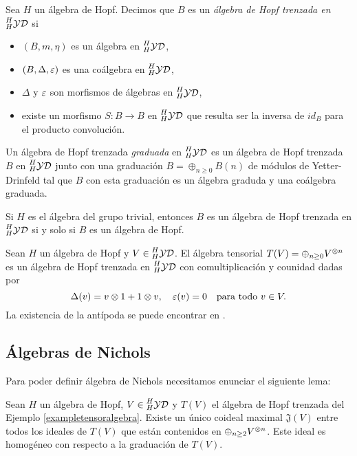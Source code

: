 \documentclass[a4paper,oneside,fleqn,11pt,../tesis.tex]{subfiles}
\newcommand{\yetter}{\prescript{H}{H}{\mathcal{YD}}}
\begin{document}
\begin{definition}
	Sea $H$ un álgebra de Hopf. Decimos que $B$ es un \emph{álgebra de Hopf trenzada en $\yetter$} si
	\begin{itemize}
	\item $\left(B, m, \eta\right)$ es un álgebra en $\yetter$,
	\item $\left(B, \Delta, \varepsilon \right)$ es una coálgebra en $\yetter$,
	\item $\Delta$ y $\varepsilon$ son morfismos de álgebras en $\yetter$,
	\item existe un morfismo $S:B \to B$ en $\yetter$ que resulta ser la inversa de $id_B$
	para el producto convolución.
	\end{itemize}
	Un álgebra de Hopf trenzada \emph{graduada} en $\yetter$ es un álgebra de Hopf trenzada $B$ en $\yetter$ junto
	con una graduación $B = \oplus_{n \geq 0}B(n)$ de módulos de Yetter-Drinfeld tal que $B$ con esta graduación es un álgebra graduda
	y una coálgebra graduada.
\end{definition}

\begin{example}
	Si $H$ es el álgebra del grupo trivial, entonces $B$ es un álgebra de Hopf trenzada en $\yetter$ si y solo si $B$ es un álgebra de Hopf.
\end{example}

\begin{example} \label{exampletensoralgebra}
	Sean $H$ un álgebra de Hopf y $V \in \yetter$. El álgebra tensorial $T(V) = \oplus_{n \geq 0}V^{\otimes n}$ es un álgebra de Hopf trenzada en $\yetter$
	con comultiplicación y counidad dadas por
	\[
		\Delta(v) = v \otimes 1 + 1 \otimes v, \quad \varepsilon(v) = 0 \quad\text{para todo } v \in V.	
	\]
	La existencia de la antípoda se puede encontrar en .
\end{example}

\subsection{Álgebras de Nichols}

Para poder definir álgebra de Nichols necesitamos enunciar el siguiente lema:
\begin{lema}
	Sean $H$ un álgebra de Hopf, $V \in \yetter$ y $T(V)$ el álgebra de Hopf trenzada del Ejemplo \ref{exampletensoralgebra}. Existe un único			coideal maximal $\mathfrak{J}(V)$ entre todos los ideales de $T(V)$ que están contenidos en $\oplus_{n \geq 2}V^{\otimes n}$. Este ideal es homogéneo
	con respecto a la graduación de $T(V)$.
\end{lema}
\end{document}
